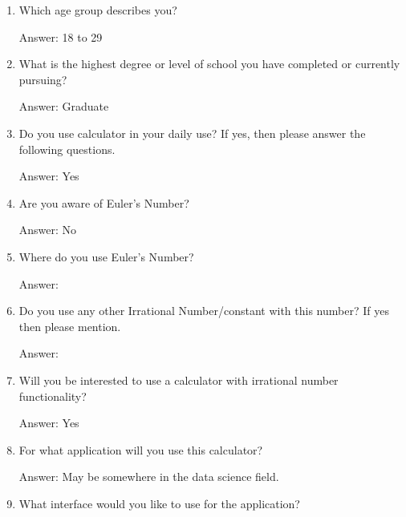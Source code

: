 \documentclass[12pt]{report}
\begin{document}
\begin{enumerate}
	\item Which age group describes you?\par

Answer: 18 to 29 \par

	\item What is the highest degree or level of school you have completed or currently pursuing?\par

Answer: Graduate\par

	\item Do you use calculator in your daily use? If yes, then please answer the following questions.\par

Answer: Yes\par

	\item Are you aware of Euler's Number?\par

Answer: No\par

	\item Where do you use Euler's Number?\par

Answer: \par

	\item Do you use any other Irrational Number/constant with this number? If yes then please mention.\par

Answer: \par

	\item Will you be interested to use a calculator with irrational number functionality?\par

Answer: Yes\par

	\item For what application will you use this calculator?\par

Answer: May be somewhere in the data science field.\par

	\item What interface would you like to use for the application?
\end{enumerate}\par
\end{document}
